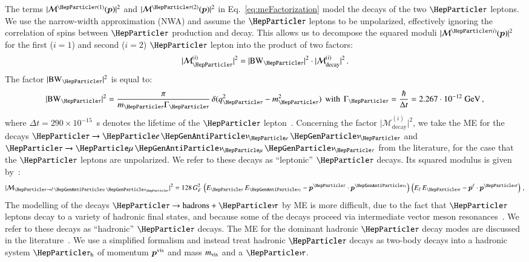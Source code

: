 The terms $\vert \mathcal{M}^{\Pgt(1)}(\bm{p}) \vert^{2}$ and $\vert
\mathcal{M}^{\Pgt(2)}(\bm{p}) \vert^{2}$ in Eq.~\ref{eq:meFactorization} model the decays of the two $\Pgt$ leptons.
We use the narrow-width approximation (NWA) and assume the $\Pgt$ leptons to be unpolarized,
effectively ignoring the correlation of spins between $\Pgt$ production and decay.
This allows us to decompose the squared moduli $\vert
\mathcal{M}^{\Pgt(i)}(\bm{p}) \vert^{2}$ for the first ($i=1$) and
second ($i=2$) $\Pgt$ lepton into the product of two factors:
\begin{equation}
\vert \mathcal{M}^{(i)}_{\Pgt} \vert^{2} = \vert \BW_{\Pgt} \vert^{2} \cdot \vert \mathcal{M}^{(i)}_{\textrm{decay}} \vert^{2} \, .
\end{equation}
The factor $\vert \BW_{\Pgt} \vert^{2}$ is equal to:
\begin{equation}
\vert \BW_{\Pgt} \vert^{2} = \frac{\pi}{m_{\Pgt}\Gamma_{\Pgt}} \,
\delta ( q_{\Pgt}^{2} - m_{\Pgt}^{2} ) \, \mbox{ with } \, 
\Gamma_{\Pgt} = \frac{\hbar}{\Delta t} =
 2.267 \cdot 10^{-12}\textrm{~\GeV} \, ,
\end{equation}
where $\Delta t = 290 \times 10^{-15}$~s denotes the lifetime of the
$\Pgt$ lepton~\cite{PDG}.
Concerning the factor $\vert \mathcal{M}^{(i)}_{\textrm{decay}}
\vert^{2}$, we take the ME for the decays $\Pgt \to \enunu$ and $\Pgt
\to \mununu$ from the literature, for the case that the $\Pgt$ leptons
are unpolarized.
We refer to these decays as ``leptonic'' $\Pgt$ decays.
Its squared modulus is given by~\cite{Barger:1987nn}:
\begin{equation}
\vert\mathcal{M}_{\Pgt \to \ellnunu} \vert^{2} = 128 \, G^{2}_{F} \,
\left( E_{\Pgt} \, E_{\APnu_{\Plepton}} - \bm{p}^{\Pgt} \cdot
  \bm{p}^{\APnu_{\Plepton}} \right) \, \left( E_{\Plepton} \,
  E_{\Pnut} - \bm{p}^{\Plepton} \cdot \bm{p}^{\Pnut} \right) \, , 
\label{eq:leptonic_tau_decays_ME}
\end{equation}
The modelling of the decays $\Pgt \to \textrm{hadrons} + \Pnut$ 
by ME is more difficult, 
due to the fact that $\Pgt$ leptons decay to a variety of hadronic
final states, and because some of the decays proceed via intermediate vector
meson resonances~\cite{PDG}.
We refer to these decays as ``hadronic'' $\Pgt$ decays.
The ME for the dominant hadronic $\Pgt$ decay modes are discussed in the literature~\cite{Bullock:1992yt,Raychaudhuri:1995kv}.
We use a simplified formalism and instead treat hadronic $\Pgt$ decays as two-body decays into a hadronic system $\tauh$ of momentum $\bm{p}^{\textrm{vis}}$ and mass $m_{\textrm{vis}}$ and a $\Pnut$.
